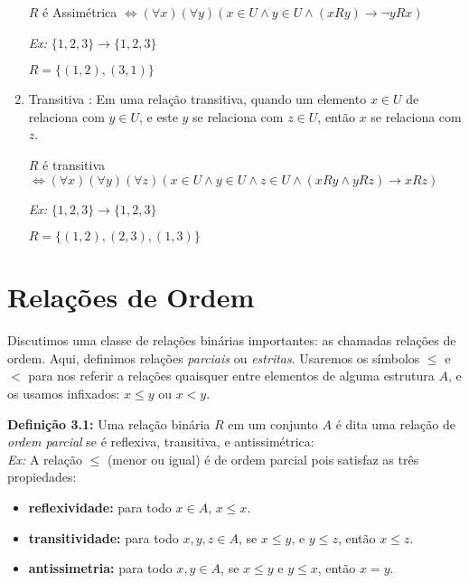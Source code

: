 \begin{enumerate}
        $R$ é Assimétrica $\Leftrightarrow (\forall x)( \forall  y)(x \in U \wedge y \in U \wedge (xRy) \rightarrow \neg yRx)$
        
        \textit{Ex:} $\{1,2,3\} \rightarrow  \{1,2,3\}$
         
        $R = \{(1,2),(3,1)\}$
        
        \item Transitiva : Em uma relação transitiva, quando um elemento $x\in U$ de relaciona com  $y\in U$, e este $y$ se relaciona com $z \in U$, então $x$ se relaciona com $z$.
        
        $R$ é transitiva $\Leftrightarrow ( \forall x)( \forall  y)( \forall z)(x \in U \wedge y \in U \wedge z \in U \wedge   (xRy  \wedge yRz) \rightarrow xRz)$
        
        \textit{Ex:} $\{1,2,3\} \rightarrow  \{1,2,3\}$
        
        $R = \{(1,2),(2,3),(1,3)\}$
        
        
     \end{enumerate}

\section{Relações de Ordem}
Discutimos uma classe de relações binárias importantes: as chamadas relações de ordem. Aqui, definimos relações \textit{parciais} ou \textit{estritas}.
Usaremos os símbolos $\leq$ e $<$ para nos referir a relações quaisquer entre elementos de alguma estrutura $A$, e os usamos infixados: $x \leq y$ ou $x < y$.

     \textbf{Definição 3.1:} Uma relação binária $R$ em um conjunto $A$ é dita uma relação de \textit{ordem parcial} se é reflexiva, transitiva, e antissimétrica:\\
     
     \textit{Ex:} A relação $\leq$ (menor ou igual) é de ordem parcial pois satisfaz as três propiedades:

    \begin{itemize}
        \item \textbf{reflexividade:} para todo $x \in A$, $x\leq x$.
        \item \textbf{transitividade:} para todo $x,y,z \in A$, se $x \leq y$, e $y \leq z$, então $x\leq z$.
        \item \textbf{antissimetria:} para todo $x,y \in A$, se $x\leq y$ e $y \leq x$, então $x=y$.
    \end{itemize}

